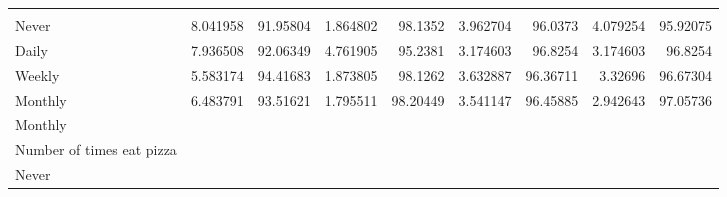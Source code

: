 \documentclass{article}
\begin{document}
\begin{table}[!h]
{\begin{tabular}{lllllllll}
				\multicolumn{1}{r}{} &
				\multicolumn{1}{r}{} &
				\multicolumn{1}{r}{} &
				\multicolumn{1}{r}{} \\
				\multicolumn{1}{l}{\hspace{5em}Never} &
				\multicolumn{1}{|r}{8.041958} &
				\multicolumn{1}{r}{91.95804} &
				\multicolumn{1}{r}{1.864802} &
				\multicolumn{1}{r}{98.1352} &
				\multicolumn{1}{r}{3.962704} &
				\multicolumn{1}{r}{96.0373} &
				\multicolumn{1}{r}{4.079254} &
				\multicolumn{1}{r}{95.92075} \\
				\multicolumn{1}{l}{\hspace{5em}Daily} &
				\multicolumn{1}{|r}{7.936508} &
				\multicolumn{1}{r}{92.06349} &
				\multicolumn{1}{r}{4.761905} &
				\multicolumn{1}{r}{95.2381} &
				\multicolumn{1}{r}{3.174603} &
				\multicolumn{1}{r}{96.8254} &
				\multicolumn{1}{r}{3.174603} &
				\multicolumn{1}{r}{96.8254} \\
				\multicolumn{1}{l}{\hspace{5em}Weekly} &
				\multicolumn{1}{|r}{5.583174} &
				\multicolumn{1}{r}{94.41683} &
				\multicolumn{1}{r}{1.873805} &
				\multicolumn{1}{r}{98.1262} &
				\multicolumn{1}{r}{3.632887} &
				\multicolumn{1}{r}{96.36711} &
				\multicolumn{1}{r}{3.32696} &
				\multicolumn{1}{r}{96.67304} \\
				\multicolumn{1}{l}{\hspace{5em}Monthly} &
				\multicolumn{1}{|r}{6.483791} &
				\multicolumn{1}{r}{93.51621} &
				\multicolumn{1}{r}{1.795511} &
				\multicolumn{1}{r}{98.20449} &
				\multicolumn{1}{r}{3.541147} &
				\multicolumn{1}{r}{96.45885} &
				\multicolumn{1}{r}{2.942643} &
				\multicolumn{1}{r}{97.05736} \\
				\multicolumn{1}{l}{\hspace{1em}Monthly} &
				\multicolumn{1}{|r}{} &
				\multicolumn{1}{r}{} &
				\multicolumn{1}{r}{} &
				\multicolumn{1}{r}{} &
				\multicolumn{1}{r}{} &
				\multicolumn{1}{r}{} &
				\multicolumn{1}{r}{} &
				\multicolumn{1}{r}{} \\
				\multicolumn{1}{l}{\hspace{2em}Number of times eat pizza} &
				\multicolumn{1}{|r}{} &
				\multicolumn{1}{r}{} &
				\multicolumn{1}{r}{} &
				\multicolumn{1}{r}{} &
				\multicolumn{1}{r}{} &
				\multicolumn{1}{r}{} &
				\multicolumn{1}{r}{} &
				\multicolumn{1}{r}{} \\
				\multicolumn{1}{l}{\hspace{3em}Never} &
				\multicolumn{1}{|r}{} &
				\multicolumn{1}{r}{} &

\end{tabular}}
\end{table}
\end{document}
